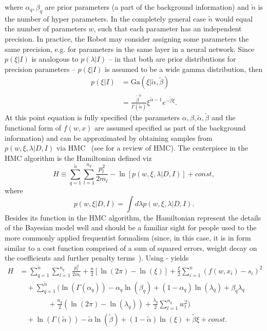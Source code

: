 where $\alpha_q,\beta_q$ are prior parameters (a part of the background information) and $\tilde{n}$ is the number of hyper parameters. In the completely general case $\tilde{n}$ would equal the number of parameters $w$, such that each parameter has an independent precision. In practice, the Robot may consider assigning some parameters the same precision, e.g. for parameters in the same layer in a neural network. Since $p(\xi|I)$ is analogous to $p(\lambda|I)$ -- in that both are prior distributions for precision parameters -- $p(\xi|I)$ is assumed to be a wide gamma distribution, then
\begin{equation}
	\begin{split}
		p(\xi|I) & = \text{Ga}(\xi|\tilde{\alpha},\tilde{\beta})\\
		& =\frac{\tilde{\beta}^{\tilde{\alpha}}}{\Gamma(\tilde{\alpha})}\xi^{\tilde{\alpha}-1}e^{-\tilde{\beta} \xi}.
	\end{split}
	\label{p7}
\end{equation}
At this point equation  is fully specified (the parameters $\alpha,\beta,\tilde{\alpha},\tilde{\beta}$ and the functional form of $f(w,x)$ are assumed specified as part of the background information) and can be approximated by obtaining samples from $p(w,\xi,\lambda|D,I)$ via HMC~\citep{Hammersley1964,Duane:1987de,Neal:1996,Neal2012} (see  for a review of HMC). The centerpiece in the HMC algorithm is the Hamiltonian defined viz~\citep{Neal:1996,Neal2012}
\begin{equation}
	H \equiv  \sum_{q=1}^{\tilde{n}}\sum_{l=1}^{n_q}\frac{p_{l}^2}{2m_{l}}-\ln[p(w,\xi,\lambda|D,I)]+const,
	\label{eqh}
\end{equation}
where 
\begin{equation}
	p(w,\xi|D,I) = \int d\lambda p(w,\xi,\lambda|D,I).
	\label{eq:ss}
\end{equation}
Besides its function in the HMC algorithm, the Hamiltonian represent the details of the Bayesian model well and should be a familiar sight for people used to the more commonly applied frequentist formalism (since, in this case, it is in form similar to a cost function comprised of a sum of squared errors, weight decay on the coefficients and further penalty terms~\citep{hastie_09,murphy2013machine,Goodfellow2016}). Using - yields
\begin{equation}
	\begin{split}
		H&=\sum_{q=1}^{\tilde{n}}\sum_{l=1}^{n_q}\frac{p_{l}^2}{2m_{l}}+\frac{n}{2}[\ln(2\pi)-\ln(\xi)] +\frac{\xi}{2}\sum_{i=1}^{n}(f(w,x_i)-s_i)^2\\
		&\quad+\sum_{q=1}^{\tilde{n}}\bigg(\ln(\Gamma(\alpha_q))-\alpha_q\ln(\beta_q)+(1-\alpha_q)\ln(\lambda_q)+\beta_q\lambda_q\\
		&\qquad\qquad+\frac{n_q}{2}(\ln(2\pi)-\ln(\lambda_q))+\frac{\lambda_q}{2}\sum_{l=1}^{n_q}w_l^2\bigg)\\
		&\quad+\ln(\Gamma(\tilde{\alpha}))-\tilde{\alpha}\ln(\tilde{\beta})+(1-\tilde{\alpha})\ln(\xi)+\tilde{\beta}\xi+const.
	\end{split}
	\label{eqh2}
\end{equation}
